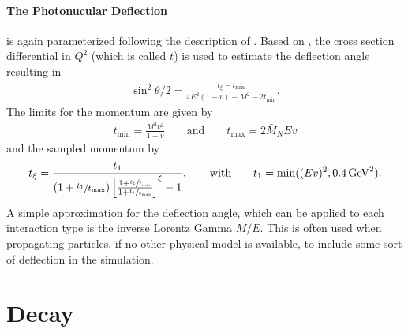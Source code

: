 \paragraph{The Photonucular Deflection} is again parameterized following the description of \cite{GEANT4}.
Based on \cite{Borog75}, the cross section differential in $Q^2$ (which is called $t$) is used to estimate the deflection angle resulting in
\begin{align}
    \sin^2 \theta/2 = \frac{t_\xi - t_{\min}}{4 E^2 (1 - v) - M^2 - 2 t_{\min}} .
\end{align}
The limits for the momentum are given by
\begin{align}
    t_{\min} = \frac{M^2 v^2}{1 - v}
    \qquad \text{and} \qquad
    t_{\max} = 2 \bar{M}_N E v
\end{align}
and the sampled momentum by
\begin{align*}
    t_\xi = \frac{t_1}{(1 + \sfrac{t_1}{t_{\max}}) \left[ \frac{1 + \sfrac{t_1}{t_{\min}}}{1 + \sfrac{t_1}{t_{\max}}} \right]^\xi - 1} ,
    \qquad
    \text{with}
    \qquad
    t_1 = \min((Ev)^2, \SI{0.4}{GeV^2}) .
\end{align*}
A simple approximation for the deflection angle, which can be applied to each interaction type is the inverse Lorentz Gamma $M/E$.
This is often used when propagating particles, if no other physical model is available, to include some sort of deflection in the simulation.

%

\section{Decay} \label{sec:decay_dsigma}


